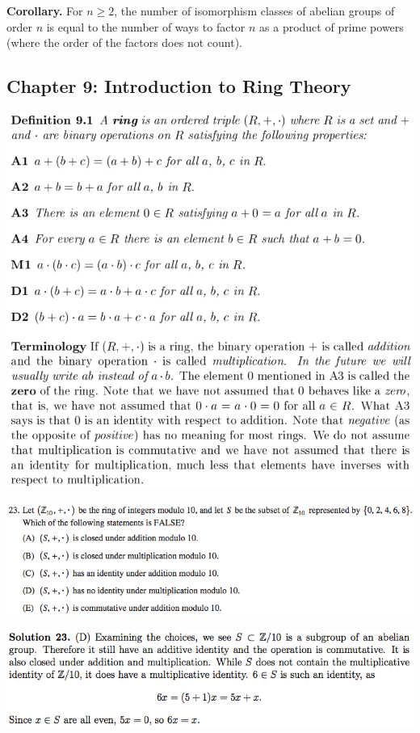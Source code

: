 \documentclass{article}
\begin{document}
\textbf{Corollary.} For \(n \geq 2\), the number of isomorphism classes of abelian groups of order \(n\) is equal to the number of ways to factor \(n\) as a product of prime powers (where the order of the factors does not count).


\pagebreak
\subsection{Chapter 9: Introduction to Ring Theory}

\includegraphics[scale=0.45]{ring_summary}

\includegraphics[scale=0.65]{1268_23}

\includegraphics[scale=0.65]{1268_23s}
\end{document}

